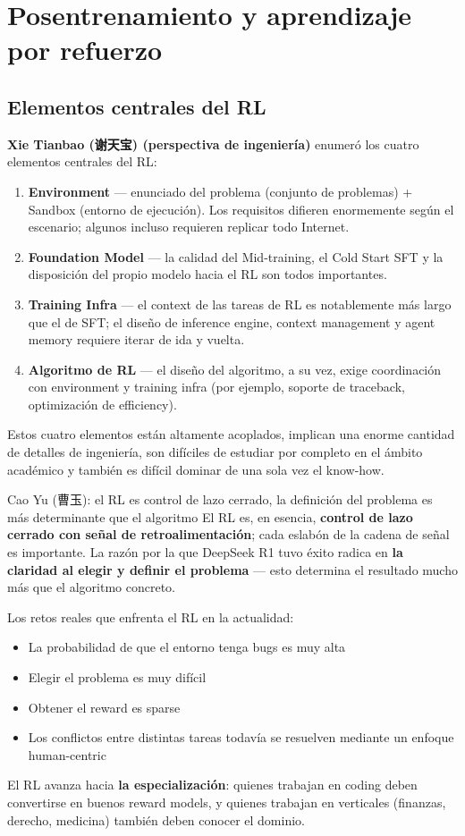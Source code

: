 \documentclass[a4paper]{article}
\begin{document}
\section{Posentrenamiento y aprendizaje por refuerzo}

\subsection{Elementos centrales del RL}

\textbf{Xie Tianbao (谢天宝) (perspectiva de ingeniería)} enumeró los cuatro elementos centrales del RL:
\begin{enumerate}
  \item \textbf{Environment} — enunciado del problema (conjunto de problemas) + Sandbox (entorno de ejecución). Los requisitos difieren enormemente según el escenario; algunos incluso requieren replicar todo Internet.
  \item \textbf{Foundation Model} — la calidad del Mid-training, el Cold Start SFT y la disposición del propio modelo hacia el RL son todos importantes.
  \item \textbf{Training Infra} — el context de las tareas de RL es notablemente más largo que el de SFT; el diseño de inference engine, context management y agent memory requiere iterar de ida y vuelta.
  \item \textbf{Algoritmo de RL} — el diseño del algoritmo, a su vez, exige coordinación con environment y training infra (por ejemplo, soporte de traceback, optimización de efficiency).
\end{enumerate}
Estos cuatro elementos están altamente acoplados, implican una enorme cantidad de detalles de ingeniería, son difíciles de estudiar por completo en el ámbito académico y también es difícil dominar de una sola vez el know-how.

\begin{importantbox}{Cao Yu (曹玉): el RL es control de lazo cerrado, la definición del problema es más determinante que el algoritmo}
El RL es, en esencia, \textbf{control de lazo cerrado con señal de retroalimentación}; cada eslabón de la cadena de señal es importante. La razón por la que DeepSeek R1 tuvo éxito radica en \textbf{la claridad al elegir y definir el problema} — esto determina el resultado mucho más que el algoritmo concreto.

Los retos reales que enfrenta el RL en la actualidad:
\begin{itemize}
  \item La probabilidad de que el entorno tenga bugs es muy alta
  \item Elegir el problema es muy difícil
  \item Obtener el reward es sparse
  \item Los conflictos entre distintas tareas todavía se resuelven mediante un enfoque human-centric
\end{itemize}
El RL avanza hacia \textbf{la especialización}: quienes trabajan en coding deben convertirse en buenos reward models, y quienes trabajan en verticales (finanzas, derecho, medicina) también deben conocer el dominio.
\end{importantbox}
\end{document}
